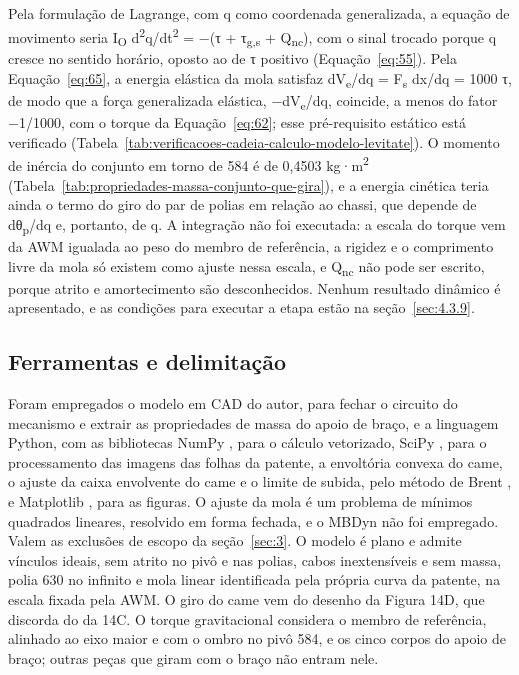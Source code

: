 Pela formulação de Lagrange, com q como coordenada generalizada, a equação de movimento seria I\textsubscript{O} d\textsuperscript{2}q/dt\textsuperscript{2} = −(τ + τ\textsubscript{g,s} + Q\textsubscript{nc}), com o sinal trocado porque q cresce no sentido horário, oposto ao de τ positivo (Equação~\eqref{eq:55}). Pela Equação~\eqref{eq:65}, a energia elástica da mola satisfaz dV\textsubscript{e}/dq = F\textsubscript{s} dx/dq = 1000 τ, de modo que a força generalizada elástica, −dV\textsubscript{e}/dq, coincide, a menos do fator −1/1000, com o torque da Equação~\eqref{eq:62}; esse pré-requisito estático está verificado (Tabela~\ref{tab:verificacoes-cadeia-calculo-modelo-levitate}). O momento de inércia do conjunto em torno de 584 é de 0,4503 kg·m\textsuperscript{2} (Tabela~\ref{tab:propriedades-massa-conjunto-que-gira}), e a energia cinética teria ainda o termo do giro do par de polias em relação ao chassi, que depende de dθ\textsubscript{p}/dq e, portanto, de q. A integração não foi executada: a escala do torque vem da AWM igualada ao peso do membro de referência, a rigidez e o comprimento livre da mola só existem como ajuste nessa escala, e Q\textsubscript{nc} não pode ser escrito, porque atrito e amortecimento são desconhecidos. Nenhum resultado dinâmico é apresentado, e as condições para executar a etapa estão na seção~\ref{sec:4.3.9}.

\subsection{Ferramentas e delimitação}\label{sec:3.3.14}

Foram empregados o modelo em CAD do autor, para fechar o circuito do mecanismo e extrair as propriedades de massa do apoio de braço, e a linguagem Python, com as bibliotecas NumPy \cite{harris2020}, para o cálculo vetorizado, SciPy \cite{virtanen2020}, para o processamento das imagens das folhas da patente, a envoltória convexa do came, o ajuste da caixa envolvente do came e o limite de subida, pelo método de Brent \cite{brent1973}, e Matplotlib \cite{hunter2007}, para as figuras. O ajuste da mola é um problema de mínimos quadrados lineares, resolvido em forma fechada, e o MBDyn não foi empregado. Valem as exclusões de escopo da seção~\ref{sec:3}. O modelo é plano e admite vínculos ideais, sem atrito no pivô e nas polias, cabos inextensíveis e sem massa, polia 630 no infinito e mola linear identificada pela própria curva da patente, na escala fixada pela AWM. O giro do came vem do desenho da Figura 14D, que discorda do da 14C. O torque gravitacional considera o membro de referência, alinhado ao eixo maior e com o ombro no pivô 584, e os cinco corpos do apoio de braço; outras peças que giram com o braço não entram nele.

